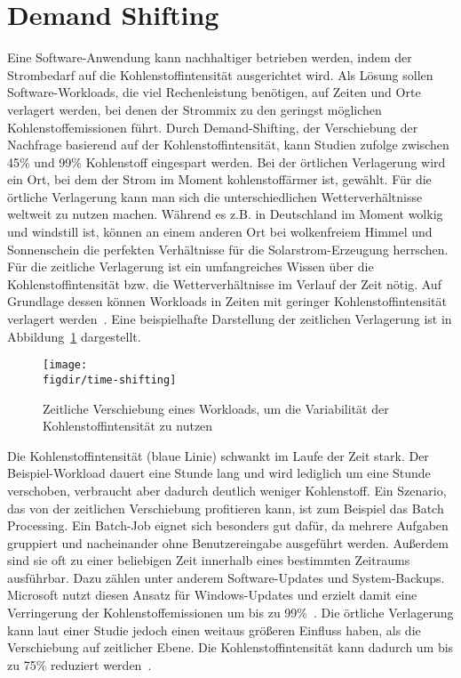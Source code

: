\section{Demand Shifting}
Eine Software-Anwendung kann nachhaltiger betrieben werden, indem der Strombedarf auf die Kohlenstoffintensität ausgerichtet wird.
Als Lösung sollen Software-Workloads, die viel Rechenleistung benötigen, auf Zeiten und Orte verlagert werden, bei denen der Strommix zu den geringst möglichen Kohlenstoffemissionen führt.
Durch Demand-Shifting, der Verschiebung der Nachfrage basierend auf der Kohlenstoffintensität, kann Studien zufolge zwischen 45\% und 99\% Kohlenstoff eingespart werden.
Bei der örtlichen Verlagerung wird ein Ort, bei dem der Strom im Moment \glqq kohlenstoffärmer\grqq{} ist, gewählt.
Für die örtliche Verlagerung kann man sich die unterschiedlichen Wetterverhältnisse weltweit zu nutzen machen.
Während es z.B. in Deutschland im Moment wolkig und windstill ist, können an einem anderen Ort bei wolkenfreiem Himmel und Sonnenschein die perfekten Verhältnisse für die Solarstrom-Erzeugung herrschen.
Für die zeitliche Verlagerung ist ein umfangreiches Wissen über die Kohlenstoffintensität bzw. die Wetterverhältnisse im Verlauf der Zeit nötig.
Auf Grundlage dessen können Workloads in Zeiten mit geringer Kohlenstoffintensität verlagert werden~\cite{GreenSoftwareFoundation.2022}.
Eine beispielhafte Darstellung der zeitlichen Verlagerung ist in Abbildung~\ref{FIG:time-shifting} dargestellt.
\begin{figure}
 \caption[Zeitliche Verschiebung eines Workloads]{Zeitliche Verschiebung eines Workloads, um die Variabilität der Kohlenstoffintensität zu nutzen~\cite{Currie.2024}}
 {\texttt{[image: \\figdir/time-shifting]}}
 \label{FIG:time-shifting}
\end{figure}
Die Kohlenstoffintensität (blaue Linie) schwankt im Laufe der Zeit stark.
Der Beispiel-Workload dauert eine Stunde lang und wird lediglich um eine Stunde verschoben, verbraucht aber dadurch deutlich weniger Kohlenstoff.
Ein Szenario, das von der zeitlichen Verschiebung profitieren kann, ist zum Beispiel das Batch Processing.
Ein Batch-Job eignet sich besonders gut dafür, da mehrere Aufgaben gruppiert und nacheinander ohne Benutzereingabe ausgeführt werden.
Außerdem sind sie oft zu einer beliebigen Zeit innerhalb eines bestimmten Zeitraums ausführbar.
Dazu zählen unter anderem Software-Updates und System-Backups.
Microsoft nutzt diesen Ansatz für Windows-Updates und erzielt damit eine Verringerung der Kohlenstoffemissionen um bis zu 99\%~\cite{Currie.2024}.
Die örtliche Verlagerung kann laut einer Studie jedoch einen weitaus größeren Einfluss haben, als die Verschiebung auf zeitlicher Ebene.
Die Kohlenstoffintensität kann dadurch um bis zu 75\% reduziert werden~\cite{Dodge.06212022}.

